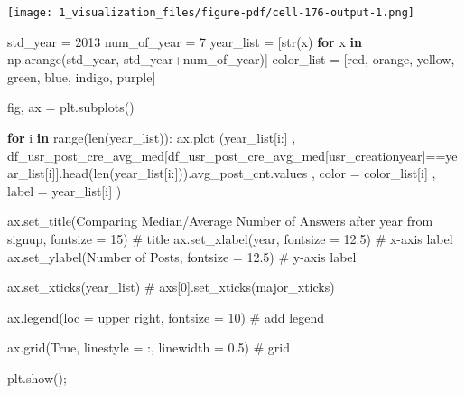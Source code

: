 \documentclass[
  letterpaper,
  DIV=11,
  numbers=noendperiod]{scrartcl}
\newenvironment{Shaded}{\begin{snugshade}}{\end{snugshade}}
\newcommand{\BuiltInTok}[1]{\textcolor[rgb]{0.00,0.23,0.31}{#1}}
\newcommand{\CommentTok}[1]{\textcolor[rgb]{0.37,0.37,0.37}{#1}}
\newcommand{\ControlFlowTok}[1]{\textcolor[rgb]{0.00,0.23,0.31}{\textbf{#1}}}
\newcommand{\DecValTok}[1]{\textcolor[rgb]{0.68,0.00,0.00}{#1}}
\newcommand{\FloatTok}[1]{\textcolor[rgb]{0.68,0.00,0.00}{#1}}
\newcommand{\KeywordTok}[1]{\textcolor[rgb]{0.00,0.23,0.31}{\textbf{#1}}}
\newcommand{\NormalTok}[1]{\textcolor[rgb]{0.00,0.23,0.31}{#1}}
\newcommand{\OperatorTok}[1]{\textcolor[rgb]{0.37,0.37,0.37}{#1}}
\newcommand{\StringTok}[1]{\textcolor[rgb]{0.13,0.47,0.30}{#1}}
\newcommand{\VariableTok}[1]{\textcolor[rgb]{0.07,0.07,0.07}{#1}}
\begin{document}
\texttt{[image: 1\_visualization\_files/figure-pdf/cell-176-output-1.png]}

\begin{Shaded}
\begin{Highlighting}[]
\NormalTok{std\_year }\OperatorTok{=} \DecValTok{2013}
\NormalTok{num\_of\_year }\OperatorTok{=} \DecValTok{7}
\NormalTok{year\_list }\OperatorTok{=}\NormalTok{ [}\BuiltInTok{str}\NormalTok{(x) }\ControlFlowTok{for}\NormalTok{ x }\KeywordTok{in}\NormalTok{ np.arange(std\_year, std\_year}\OperatorTok{+}\NormalTok{num\_of\_year)]}
\NormalTok{color\_list }\OperatorTok{=}\NormalTok{ [}\StringTok{\textquotesingle{}red\textquotesingle{}}\NormalTok{, }\StringTok{\textquotesingle{}orange\textquotesingle{}}\NormalTok{, }\StringTok{\textquotesingle{}yellow\textquotesingle{}}\NormalTok{, }\StringTok{\textquotesingle{}green\textquotesingle{}}\NormalTok{, }\StringTok{\textquotesingle{}blue\textquotesingle{}}\NormalTok{, }\StringTok{\textquotesingle{}indigo\textquotesingle{}}\NormalTok{, }\StringTok{\textquotesingle{}purple\textquotesingle{}}\NormalTok{]}

\NormalTok{fig, ax }\OperatorTok{=}\NormalTok{ plt.subplots()}

\ControlFlowTok{for}\NormalTok{ i }\KeywordTok{in} \BuiltInTok{range}\NormalTok{(}\BuiltInTok{len}\NormalTok{(year\_list)):   }
\NormalTok{        ax.plot (year\_list[i:]}
\NormalTok{        , df\_usr\_post\_cre\_avg\_med[df\_usr\_post\_cre\_avg\_med[}\StringTok{\textquotesingle{}usr\_creationyear\textquotesingle{}}\NormalTok{]}\OperatorTok{==}\NormalTok{year\_list[i]].head(}\BuiltInTok{len}\NormalTok{(year\_list[i:])).avg\_post\_cnt.values}
\NormalTok{        ,  color }\OperatorTok{=}\NormalTok{ color\_list[i]}
\NormalTok{        ,  label }\OperatorTok{=}\NormalTok{ year\_list[i]}
\NormalTok{        ) }


\NormalTok{ax.set\_title(}\StringTok{\textquotesingle{}Comparing Median/Average Number of Answers after year from signup\textquotesingle{}}\NormalTok{, fontsize }\OperatorTok{=} \DecValTok{15}\NormalTok{) }\CommentTok{\# title}
\NormalTok{ax.set\_xlabel(}\StringTok{\textquotesingle{}year\textquotesingle{}}\NormalTok{, fontsize }\OperatorTok{=} \FloatTok{12.5}\NormalTok{) }\CommentTok{\# x{-}axis label}
\NormalTok{ax.set\_ylabel(}\StringTok{\textquotesingle{}Number of Posts\textquotesingle{}}\NormalTok{, fontsize }\OperatorTok{=} \FloatTok{12.5}\NormalTok{) }\CommentTok{\# y{-}axis label}

\NormalTok{ax.set\_xticks(year\_list)}
\CommentTok{\# axs[0].set\_xticks(major\_xticks)}

\NormalTok{ax.legend(loc }\OperatorTok{=} \StringTok{\textquotesingle{}upper right\textquotesingle{}}\NormalTok{, fontsize }\OperatorTok{=} \DecValTok{10}\NormalTok{) }\CommentTok{\# add legend}

\NormalTok{ax.grid(}\VariableTok{True}\NormalTok{, linestyle }\OperatorTok{=} \StringTok{\textquotesingle{}:\textquotesingle{}}\NormalTok{, linewidth }\OperatorTok{=} \FloatTok{0.5}\NormalTok{) }\CommentTok{\# grid}

\NormalTok{plt.show()}\OperatorTok{;}
\end{Highlighting}
\end{Shaded}
\end{document}
